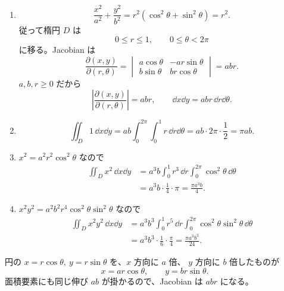 \begin{enumerate}
  \item
  \[
  \frac{x^2}{a^2}+\frac{y^2}{b^2}
  =r^2(\cos^2\theta+\sin^2\theta)=r^2.
  \]
  従って楕円 \(D\) は
  \[
  0\le r\le1,\qquad 0\le\theta<2\pi
  \]
  に移る。Jacobian は
  \[
  \frac{\partial(x,y)}{\partial(r,\theta)}
  =\begin{vmatrix}
  a\cos\theta&-ar\sin\theta\\
  b\sin\theta&br\cos\theta
  \end{vmatrix}
  =ab r.
  \]
  \(a,b,r\ge0\) だから
  \[
  \boxed{\left|\frac{\partial(x,y)}{\partial(r,\theta)}\right|=ab r},
  \qquad
  \dd x\dd y=ab r\,\dd r\dd\theta.
  \]

  \item
  \[
  \iint_D1\,\dd x\dd y
  =ab\int_0^{2\pi}\int_0^1r\,\dd r\dd\theta
  =ab\cdot2\pi\cdot\frac12
  =\boxed{\pi ab}.
  \]

  \item \(x^2=a^2r^2\cos^2\theta\) なので
  \begin{align*}
  \iint_Dx^2\,\dd x\dd y
  &=a^3b
  \int_0^1r^3\,\dd r
  \int_0^{2\pi}\cos^2\theta\,\dd\theta\\
  &=a^3b\cdot\frac14\cdot\pi
  =\boxed{\frac{\pi a^3b}{4}}.
  \end{align*}

  \item \(x^2y^2=a^2b^2r^4\cos^2\theta\sin^2\theta\) なので
  \begin{align*}
  \iint_Dx^2y^2\,\dd x\dd y
  &=a^3b^3
  \int_0^1r^5\,\dd r
  \int_0^{2\pi}\cos^2\theta\sin^2\theta\,\dd\theta\\
  &=a^3b^3\cdot\frac16\cdot\frac\pi4
  =\boxed{\frac{\pi a^3b^3}{24}}.
  \end{align*}
\end{enumerate}

\begin{pointbox}[楕円の変数変換]
円の \(x=r\cos\theta,\ y=r\sin\theta\) を、\(x\) 方向に \(a\) 倍、
\(y\) 方向に \(b\) 倍したものが
\[
x=ar\cos\theta,\qquad y=br\sin\theta.
\]
面積要素にも同じ伸び \(ab\) が掛かるので、Jacobian は \(ab r\) になる。
\end{pointbox}


